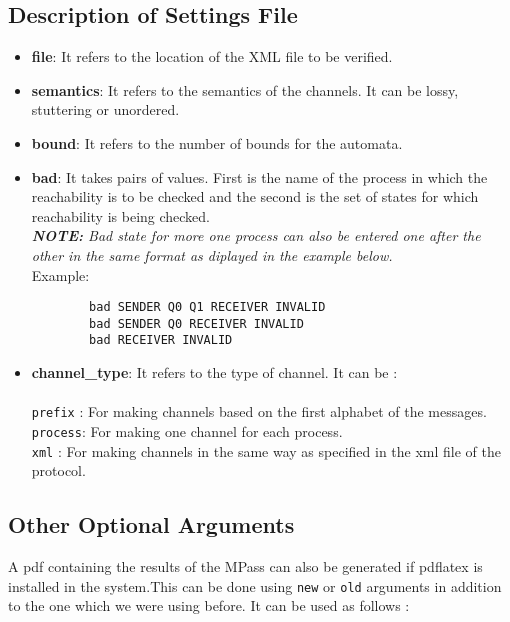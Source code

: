 \documentclass[a4paper]{article}
\begin{document}
\subsection{Description of Settings File}
\begin{itemize}
\item {\bf file}: It refers to the location of the XML file to be verified.

\item {\bf semantics}: It refers to the semantics of the channels. It can be lossy, stuttering or unordered.

\item {\bf bound}: It refers to the number of bounds for the automata.

\item {\bf bad}: It takes pairs of values. First is the name of the process in which the reachability is to be checked and the second is the  set of states for which reachability is being checked.\\
\emph{{\bf NOTE: }Bad state for more one process can also be entered one after the other in the same format as diplayed in the example below.}\\

Example:
\begin{verbatim}
        bad SENDER Q0 Q1 RECEIVER INVALID
        bad SENDER Q0 RECEIVER INVALID
        bad RECEIVER INVALID
\end{verbatim}

\item {\bf channel\_type}: It refers to the type of channel. It can be :\\\\
{\tt prefix} : For making channels based on the first alphabet of the messages.\\
{\tt process}: For making one channel for each process.\\
{\tt xml} : For making channels in the same way as specified in the xml file of the protocol.

\end{itemize}

\subsection{Other Optional Arguments}
\def\verbatim@font{\normalfont\ttfamily}

A pdf containing the results of the MPass can also be generated if pdflatex is 
installed in the system.This can be done using {\tt new} or {\tt old} arguments in addition to the one which we were using before. It can be used as follows :\\
\end{document}
